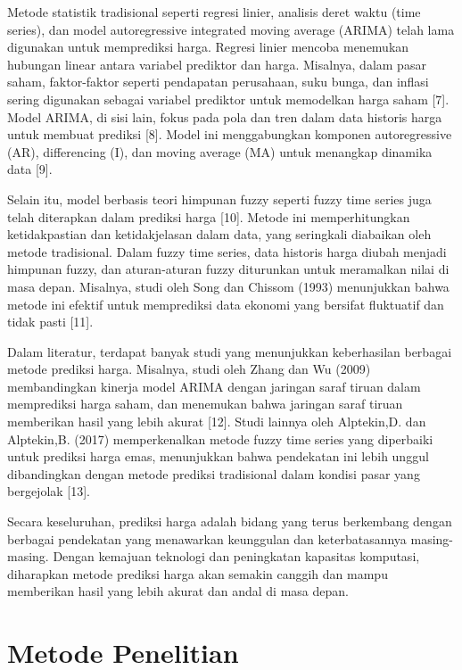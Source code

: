 \documentclass[conference]{IEEEtran}
\begin{document}
Metode statistik tradisional seperti regresi linier, analisis deret waktu (time series), dan model autoregressive integrated moving average (ARIMA) telah lama digunakan untuk memprediksi harga. Regresi linier mencoba menemukan hubungan linear antara variabel prediktor dan harga. Misalnya, dalam pasar saham, faktor-faktor seperti pendapatan perusahaan, suku bunga, dan inflasi sering digunakan sebagai variabel prediktor untuk memodelkan harga saham [7]. Model ARIMA, di sisi lain, fokus pada pola dan tren dalam data historis harga untuk membuat prediksi [8]. Model ini menggabungkan komponen autoregressive (AR), differencing (I), dan moving average (MA) untuk menangkap dinamika data [9].

Selain itu, model berbasis teori himpunan fuzzy seperti fuzzy time series juga telah diterapkan dalam prediksi harga [10]. Metode ini memperhitungkan ketidakpastian dan ketidakjelasan dalam data, yang seringkali diabaikan oleh metode tradisional. Dalam fuzzy time series, data historis harga diubah menjadi himpunan fuzzy, dan aturan-aturan fuzzy diturunkan untuk meramalkan nilai di masa depan. Misalnya, studi oleh Song dan Chissom (1993) menunjukkan bahwa metode ini efektif untuk memprediksi data ekonomi yang bersifat fluktuatif dan tidak pasti [11].

Dalam literatur, terdapat banyak studi yang menunjukkan keberhasilan berbagai metode prediksi harga. Misalnya, studi oleh Zhang dan Wu (2009) membandingkan kinerja model ARIMA dengan jaringan saraf tiruan dalam memprediksi harga saham, dan menemukan bahwa jaringan saraf tiruan memberikan hasil yang lebih akurat [12]. Studi lainnya oleh Alptekin,D. dan Alptekin,B. (2017) memperkenalkan metode fuzzy time series yang diperbaiki untuk prediksi harga emas, menunjukkan bahwa pendekatan ini lebih unggul dibandingkan dengan metode prediksi tradisional dalam kondisi pasar yang bergejolak [13].

Secara keseluruhan, prediksi harga adalah bidang yang terus berkembang dengan berbagai pendekatan yang menawarkan keunggulan dan keterbatasannya masing-masing. Dengan kemajuan teknologi dan peningkatan kapasitas komputasi, diharapkan metode prediksi harga akan semakin canggih dan mampu memberikan hasil yang lebih akurat dan andal di masa depan.



\section{Metode Penelitian}
\end{document}

